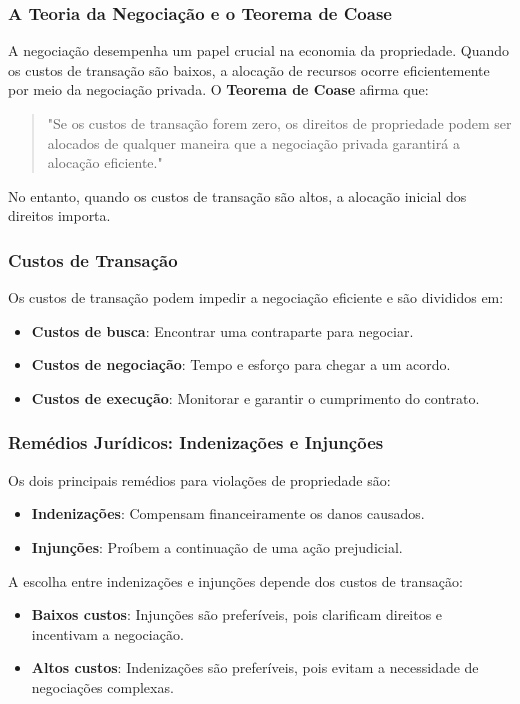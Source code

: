 \documentclass[a4paper,12pt]{article}[abntex2]
\begin{document}
\subsubsection{A Teoria da Negociação e o Teorema de Coase}
A negociação desempenha um papel crucial na economia da propriedade. Quando os custos de transação são baixos, a alocação de recursos ocorre eficientemente por meio da negociação privada. O \textbf{Teorema de Coase} afirma que:
\begin{quote}
    "Se os custos de transação forem zero, os direitos de propriedade podem ser alocados de qualquer maneira que a negociação privada garantirá a alocação eficiente."
\end{quote}
No entanto, quando os custos de transação são altos, a alocação inicial dos direitos importa.

\subsubsection{Custos de Transação}
Os custos de transação podem impedir a negociação eficiente e são divididos em:
\begin{itemize}
    \item \textbf{Custos de busca}: Encontrar uma contraparte para negociar.
    \item \textbf{Custos de negociação}: Tempo e esforço para chegar a um acordo.
    \item \textbf{Custos de execução}: Monitorar e garantir o cumprimento do contrato.
\end{itemize}

\subsubsection{Remédios Jurídicos: Indenizações e Injunções}
Os dois principais remédios para violações de propriedade são:
\begin{itemize}
    \item \textbf{Indenizações}: Compensam financeiramente os danos causados.
    \item \textbf{Injunções}: Proíbem a continuação de uma ação prejudicial.
\end{itemize}

A escolha entre indenizações e injunções depende dos custos de transação:
\begin{itemize}
    \item \textbf{Baixos custos}: Injunções são preferíveis, pois clarificam direitos e incentivam a negociação.
    \item \textbf{Altos custos}: Indenizações são preferíveis, pois evitam a necessidade de negociações complexas.
\end{itemize}
\end{document}
